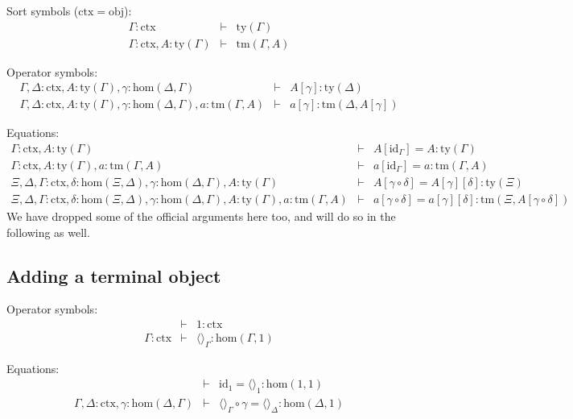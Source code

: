 \documentclass[11pt,a4paper]{article}
\theoremstyle{definition}
\newcommand{\id}{\mathsf{id}}
\def\Obj{\mathrm{obj}}
\def\Hom{\mathrm{hom}}
\def\id{\mathrm{id}}
\newcommand{\ctx}{\mathrm{ctx}}
\newcommand{\ty}{\mathrm{ty}}
\newcommand{\tm}{\mathrm{tm}}
\newcommand{\tuple}[1]{\langle #1 \rangle}
\begin{document}
\begin{tiny}
Sort symbols ($\ctx = \Obj$):
\begin{eqnarray*}
\Gamma : \ctx &\vdash& \ty(\Gamma)\\
\Gamma : \ctx, A:\ty(\Gamma) &\vdash& \tm(\Gamma,A)
\end{eqnarray*}

Operator symbols:
\begin{eqnarray*}
\Gamma,\Delta : \ctx, A:\ty(\Gamma), \gamma : \Hom(\Delta,\Gamma) &\vdash&
A[\gamma] : \ty(\Delta)\\
\Gamma,\Delta : \ctx, A:\ty(\Gamma), \gamma : \Hom(\Delta,\Gamma), a:\tm(\Gamma,A) &\vdash&  a[\gamma] : \tm(\Delta,A[\gamma])
\end{eqnarray*}

Equations:
\begin{eqnarray*}
\Gamma : \ctx, A:\ty(\Gamma) &\vdash& A[\id_\Gamma] = A : \ty(\Gamma)\\
\Gamma : \ctx, A:\ty(\Gamma), a:\tm(\Gamma,A) &\vdash& a[\id_\Gamma] = a : \tm(\Gamma,A)\\
\Xi,\Delta,\Gamma : \ctx, \delta : \Hom(\Xi,\Delta), \gamma : \Hom(\Delta,\Gamma),
A:\ty(\Gamma) &\vdash& A[\gamma\circ\delta] = A[\gamma][\delta]: \ty(\Xi)\\
\Xi,\Delta,\Gamma : \ctx, \delta : \Hom(\Xi,\Delta), \gamma : \Hom(\Delta,\Gamma),
A:\ty(\Gamma), a:\tm(\Gamma,A) &\vdash&
a[\gamma\circ\delta] = a[\gamma][\delta]: \tm(\Xi,A[\gamma\circ\delta])
\end{eqnarray*}
We have dropped some of the official arguments here too, and will do so in the following as well.
\end{tiny}


\subsection{Adding a terminal object}

\begin{tiny}
Operator symbols:
\begin{eqnarray*}
&\vdash& 1 : \ctx\\
\Gamma : \ctx &\vdash& \tuple{}_\Gamma : \Hom(\Gamma,1)
\end{eqnarray*}

Equations:
\begin{eqnarray*}
 &\vdash& \id_1 = \tuple{}_1 : \Hom(1,1)\\
\Gamma,\Delta : \ctx, \gamma : \Hom(\Delta,\Gamma) &\vdash&
\tuple{}_\Gamma\circ\gamma = \tuple{}_\Delta : \Hom(\Delta,1)
\end{eqnarray*}
\end{tiny}
\end{document}
